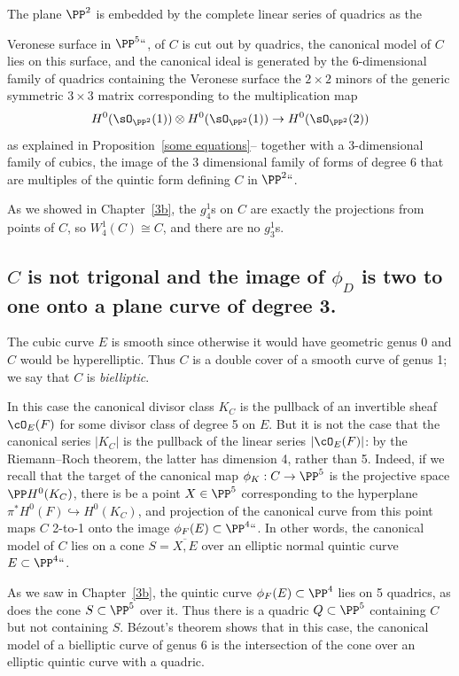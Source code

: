 The plane $\PP^2$ is embedded by the complete linear series of quadrics
as the 
{Veronese surface in $\PP^5``$,
of $C$ is cut out by quadrics, the canonical model of $C$
lies on this surface, and the canonical ideal is generated by the
6-dimensional family of quadrics containing the Veronese surface\emdash
the $2\times 2$ minors of the generic symmetric $3\times 3$ matrix
corresponding to the multiplication map
$$
H^{0}(\sO_{\PP^{2}}(1)) \otimes H^{0}(\sO_{\PP^{2}}(1)) \to
H^{0}(\sO_{\PP^{2}}(2))
$$
as explained in Proposition~\ref{some equations}-- together with a
3-dimensional family of cubics,  the image of the 3 dimensional family
of forms of degree 6 that are multiples of the quintic form defining $C$
in $\PP^2` `$.

As we showed in Chapter~\ref{3b}, the $g^1_4$s on $C$ are exactly the
projections from points of $C$, so $W^1_4(C)\cong C$, and there are no
$g^{1}_{3}$s.


\subsection*{$C$ is not trigonal and the image of
\texorpdfstring{$\phi_{D}$}{phi(D)} is two to one onto a  plane curve
of degree 3.}

The cubic curve $E$ is smooth since otherwise it would have geometric
genus 0 and $C$ would be  hyperelliptic. Thus $C$ is a double cover of
a smooth curve of genus 1; we say that $C$ is \emph{bielliptic}.

In this case the canonical divisor class $K_C$ is the pullback of
an invertible sheaf $\cO_E(F)$ for some divisor class of degree 5 on
$E$. But it is not the case that the canonical series $|K_C|$ is the
pullback of the linear series $|\cO_E(F)|$: by the Riemann--Roch theorem,
the latter has dimension 4, rather than 5. Indeed, if we recall that
the target of the canonical map $\phi_K : C \to \PP^5$ is the projective
space $\PP H^0(K_C)$, there is be a point $X \in \PP^5$ corresponding to
the hyperplane $\pi^*H^0(F) \hookrightarrow H^0(K_C)$, and projection
of the canonical curve from this point maps $C$ 2-to-1 onto the image
$\phi_F(E) \subset \PP^4` `$. In other words, the canonical model of $C$
lies on a cone $S = \overline{X, E}$ over an elliptic normal quintic
curve $E \subset \PP^4` `$.

As we saw in Chapter~\ref{3b}, the quintic curve $\phi_F(E) \subset \PP^4$
lies on 5 quadrics, as does the cone $S \subset \PP^5$ over it. Thus
there is a quadric $Q \subset \PP^5$ containing $C$ but not containing
$S$. B\'ezout's theorem shows that in this case, the canonical model of
a bielliptic curve of genus 6 is the intersection of the cone over an
elliptic quintic curve with a quadric.

}
